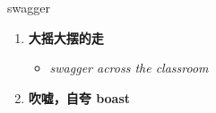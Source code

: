 
\begin{frame}
{\huge swagger}
\begin{center}
\begin{enumerate}\Large
  \item \textbf{大摇大摆的走}
  \begin{itemize}
    \item \em{\Large{swagger across the classroom}}
  \end{itemize}
  \item \textbf{吹嘘，自夸 boast}
\end{enumerate}
\end{center}
\end{frame}
